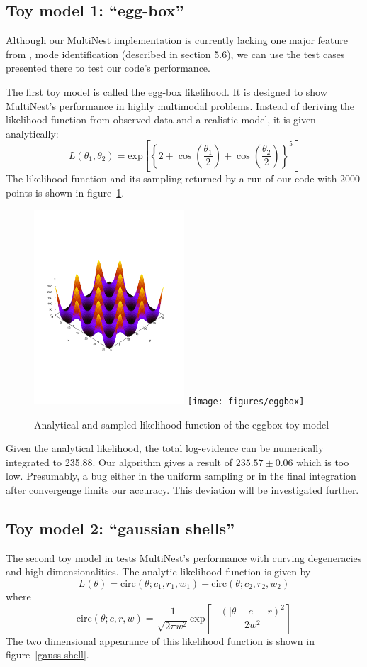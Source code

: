 \documentclass{article}
\begin{document}
\subsection{Toy model 1: ``egg-box''}
Although our MultiNest implementation is currently lacking one major feature from  \cite{2009MNRAS.398.1601F}, mode identification (described in section 5.6), we can use the test cases presented there to test our code's performance.

The first toy model is called the egg-box likelihood. It is designed to show MultiNest's performance in highly multimodal problems. Instead of deriving the likelihood function from observed data and a realistic model, it is given analytically:
\[L(\theta_1,\theta_2) = \mathrm{exp}
\left[\left\{2+\cos\left(\frac{\theta_1}{2}\right)+\cos\left(\frac{\theta_2}{2}\right)\right\}^5\right]\]
The likelihood function and its sampling returned by a run of our code with 2000 points is shown in figure~\ref{eggbox}.

\begin{figure}\label{eggbox}
\includegraphics[width=0.5\textwidth]{figures/eggbox_analytic}
\texttt{[image: figures/eggbox]}
\caption{Analytical and sampled likelihood function of the eggbox toy model}
\end{figure}

Given the analytical likelihood, the total log-evidence can be numerically integrated to 235.88. Our algorithm gives a result of $235.57\pm 0.06$ which is too low. Presumably, a bug either in the uniform sampling or in the final integration after convergenge limits our accuracy. This deviation will be investigated further.

\subsection{Toy model 2: ``gaussian shells''}
The second toy model in \cite{2009MNRAS.398.1601F} tests MultiNest's performance with curving degeneracies and high dimensionalities. The analytic likelihood function is given by
\[L(\theta) = \mathrm{circ}(\theta;c_1,r_1,w_1)+\mathrm{circ}(\theta;c_2,r_2,w_2)\]
where
\[ \mathrm{circ}(\theta;c,r,w) = \frac{1}{\sqrt{2\pi w^2}}\mathrm{exp}\left[-\frac{(|\theta - c|-r)^2}{2w^2}\right]\]
The two dimensional appearance of this likelihood function is shown in figure~\ref{gauss-shell}.
\end{document}
